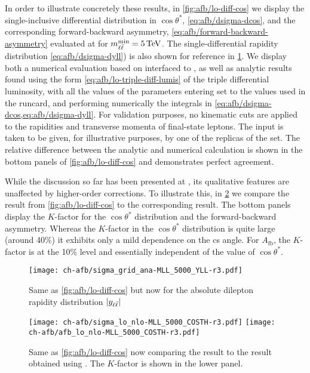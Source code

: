 In order to illustrate concretely these results,  
in \cref{fig:afb/lo-diff-cos} we display the
single-inclusive differential distribution in $\cos\theta^*$,
\cref{eq:afb/dsigma-dcos},
and the corresponding forward-backward asymmetry,
\cref{eq:afb/forward-backward-asymmetry} evaluated at \lo
for $\mll^{\text{min}}=\SI{5}{\TeV}$. The single-differential rapidity
distribution \cref{eq:afb/dsigma-dyll}) is also shown for reference in \cref{fig:afb/lo-diff-yll}.
%
We display both a numerical evaluation based on \mgamc interfaced to \pineappl,
as well as analytic results found using the form \cref{eq:afb/lo-triple-diff-lumis}
of the triple differential luminosity, with all the values of the parameters
entering  set to the values used in the \mgamc
runcard, and performing  numerically the integrals in
\cref{eq:afb/dsigma-dcos,eq:afb/dsigma-dyll}.
%
For validation purposes, no kinematic cuts are applied to the rapidities and
transverse momenta of final-state leptons.
The \pdf input is taken to be given, for illustrative purposes, by one of the
replicas of the  \nnlo set.
The relative difference between the analytic and numerical calculation is shown
in the bottom panels of \cref{fig:afb/lo-diff-cos} and demonstrates perfect
agreement. 

While the discussion so far has been presented at \lo, its qualitative features
are unaffected by  higher-order corrections.
%
To illustrate this, in \cref{fig:afb/lo-kfact} we compare the \lo result  from
\cref{fig:afb/lo-diff-cos} to the corresponding \nlo \qcd result.
%
The bottom panels display the \nlo $K$-factor for the $\cos\theta^*$
distribution and the forward-backward asymmetry.
%
Whereas the \nlo $K$-factor in the $\cos\theta^*$ distribution is quite large
(around 40\%) it exhibits only a mild dependence on the \acrlong{cs} angle.
%
For $A_{\text{fb}}$, the $K$-factor is at the 10\% level and essentially
independent of the value of $\cos\theta^*$.

\begin{figure}[t]
  \centering
  \texttt{[image: ch-afb/sigma\_grid\_ana-MLL\_5000\_YLL-r3.pdf]}
  \caption{
    Same as \cref{fig:afb/lo-diff-cos} but now for the absolute dilepton
    rapidity distribution $|y_{\ell\bar{\ell}}|$
  }
  \label{fig:afb/lo-diff-yll}
\end{figure}
 
\begin{figure}[t]
  \centering
  \texttt{[image: ch-afb/sigma\_lo\_nlo-MLL\_5000\_COSTH-r3.pdf]}
  \texttt{[image: ch-afb/afb\_lo\_nlo-MLL\_5000\_COSTH-r3.pdf]}
  \caption{Same as \cref{fig:afb/lo-diff-cos} now comparing the \lo result
    to the \nlo \qcd result obtained using \mgamc.
    The $K$-factor is shown in the lower panel.
  }
  \label{fig:afb/lo-kfact}
\end{figure}
